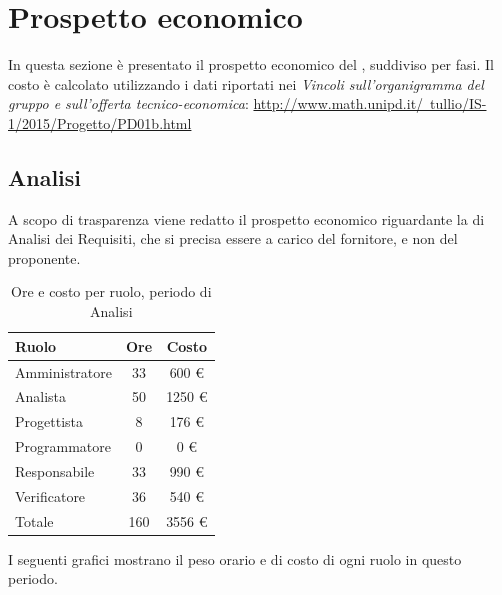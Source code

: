 \section{Prospetto economico}
In questa sezione è presentato il prospetto economico del  , suddiviso per fasi. Il costo è calcolato utilizzando i dati
riportati nei \textit{Vincoli sull’organigramma del gruppo e sull’offerta tecnico-economica}:
\href{http://www.math.unipd.it/~tullio/IS-1/2015/Progetto/PD01b.html}{http://www.math.unipd.it/~tullio/IS-1/2015/Progetto/PD01b.html}


\subsection{Analisi}
A scopo di trasparenza viene redatto il prospetto economico riguardante la  di Analisi dei Requisiti, che si precisa essere a carico del fornitore, e non del proponente.

\begin{table}[H]
	\centering
	\begin{tabular}{ l c c }
		\textbf{Ruolo} & \textbf{Ore} & \textbf{Costo} \\
		\hline
		Amministratore & 33 & 600 \euro{} \\
		Analista & 50 & 1250 \euro{} \\
		Progettista & 8 & 176 \euro{} \\
		Programmatore & 0 & 0 \euro{} \\
		Responsabile & 33 & 990 \euro{} \\
		Verificatore & 36 & 540 \euro{} \\
		\hline
		Totale & 160 & 3556 \euro{} \\
		\hline
	\end{tabular}
	\caption{Ore e costo per ruolo, periodo di Analisi}
\end{table}

I seguenti grafici mostrano il peso orario e di costo di ogni ruolo in questo periodo.


